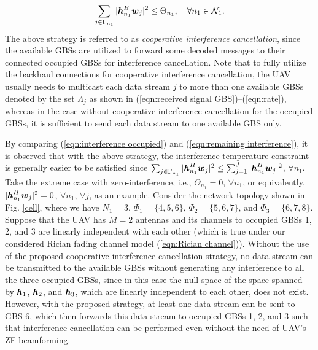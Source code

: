 \documentclass[onecolumn, draftclsnofoot, 12pt]{IEEEtran}
\newcommand{\mv}[1]{\mbox{\boldmath{$ #1 $}}}
\begin{document}
\begin{equation}\label{eqn:remaining interference}
\sum\limits_{j\in \Gamma_{n_1}} |\mv{h}_{n_1}^H\mv{w}_j|^2\leq \Theta_{n_1}, ~~~ \forall n_1\in \mathcal{N}_1.
\end{equation}
The above strategy is referred to as \emph{cooperative interference cancellation}, since the available GBSs are utilized to forward some decoded messages to their connected occupied GBSs for interference cancellation. Note that to fully utilize the backhaul connections for cooperative interference cancellation, the UAV usually needs to multicast each data stream $j$ to more than one available GBSs denoted by the set $\Lambda_j$ as shown in (\ref{eqn:received signal GBS})--(\ref{eqn:rate}), whereas in the case without cooperative interference cancellation for the occupied GBSs, it is sufficient to send each data stream to one available GBS only.


By comparing (\ref{eqn:interference occupied}) and (\ref{eqn:remaining interference}), it is observed that with the above strategy, the interference temperature constraint is generally easier to be satisfied since $\sum_{j\in \Gamma_{n_1}} |\mv{h}_{n_1}^H\mv{w}_j|^2\leq \sum_{j=1}^J|\mv{h}_{n_1}^H\mv{w}_j|^2$, $\forall n_1$. Take the extreme case with zero-interference, i.e., $\Theta_{n_1}=0$, $\forall n_1$, or equivalently, $|\mv{h}_{n_1}^H\mv{w}_j|^2=0$, $\forall n_1$, $\forall j$, as an example. Consider the network topology shown in Fig. \ref{cell}, where we have $N_1=3$, $\Phi_{1}=\{4,5,6\}$, $\Phi_2=\{5,6,7\}$, and $\Phi_3=\{6,7,8\}$. Suppose that the UAV has $M=2$ antennas and its channels to occupied GBSs 1, 2, and 3 are linearly independent with each other (which is true under our considered Rician fading channel model (\ref{eqn:Rician channel})). Without the use of the proposed cooperative interference cancellation strategy, no data stream can be transmitted to the available GBSs without generating any interference to all the three occupied GBSs, since in this case the null space of the space spanned by $\mv{h}_1$, $\mv{h}_2$, and $\mv{h}_3$, which are linearly independent to each other, does not exist. However, with the proposed strategy, at least one data stream can be sent to GBS 6, which then forwards this data stream to occupied GBSs 1, 2, and 3 such that interference cancellation can be performed even without the need of UAV's ZF beamforming.
\end{document}
